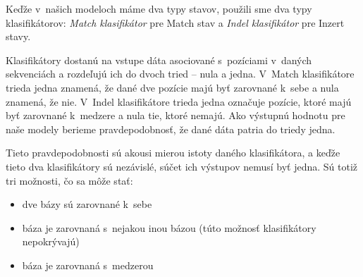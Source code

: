 
Keďže v~našich modeloch máme dva typy stavov, použili sme dva typy klasifikátorov: \textit{Match klasifikátor} pre Match stav a \textit{Indel klasifikátor} pre Inzert stavy.

Klasifikátory dostanú na vstupe dáta asociované s~pozíciami v~daných sekvenciách a rozdeľujú ich do dvoch tried -- nula a jedna. V~Match klasifikátore trieda jedna znamená, že dané dve pozície majú byť zarovnané k~sebe a nula znamená, že nie. V~Indel klasifikátore trieda jedna označuje pozície, ktoré majú byť zarovnané k~medzere a nula tie, ktoré nemajú. Ako výstupnú hodnotu pre naše modely berieme pravdepodobnosť, že dané dáta patria do triedy jedna.

Tieto pravdepodobnosti sú akousi mierou istoty daného klasifikátora, a keďže tieto dva klasifikátory sú nezávislé, súčet ich výstupov nemusí byť jedna. Sú totiž tri možnosti, čo sa môže stať:
\begin{itemize}
    \item dve bázy sú zarovnané k~sebe
    \item báza je zarovnaná s~nejakou inou bázou (túto možnosť klasifikátory nepokrývajú)
    \item báza je zarovnaná s~medzerou
\end{itemize}

